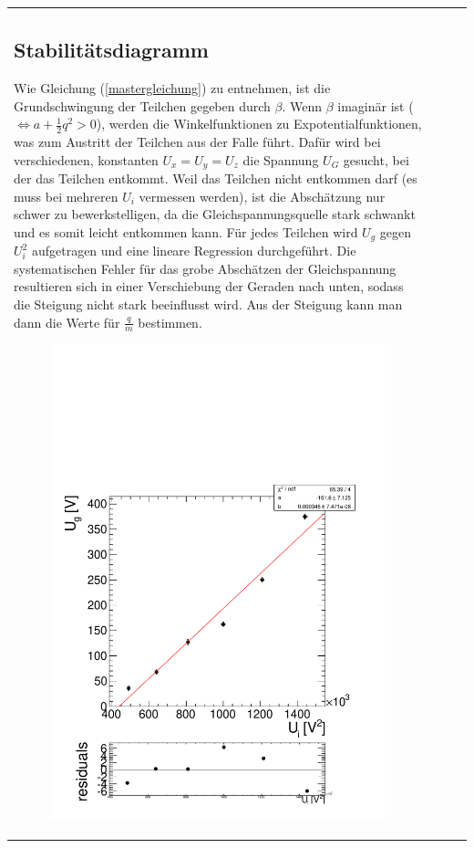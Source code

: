 \documentclass[a4paper,12pt]{article}
\begin{document}
\begin{tabular}{ l | c | c | r }
\subsection{Stabilitätsdiagramm}
Wie Gleichung (\ref{mastergleichung}) zu entnehmen, ist die Grundschwingung der Teilchen gegeben durch $β$.
Wenn $β$ imaginär ist ($ \Leftrightarrow a + \frac12q^2 >0$), werden die Winkelfunktionen zu Expotentialfunktionen, was zum Austritt der Teilchen aus der Falle führt.
Dafür wird bei verschiedenen, konstanten $U_x = U_y = U_z$ die Spannung $U_G$ gesucht, bei der das Teilchen entkommt.
Weil das Teilchen nicht entkommen darf (es muss bei mehreren $U_i$ vermessen werden), ist die Abschätzung nur schwer zu bewerkstelligen, da die Gleichspannungsquelle stark schwankt und es somit leicht entkommen kann.
Für jedes Teilchen wird $U_g$ gegen $U_i^2$ aufgetragen und eine lineare Regression durchgeführt.
Die systematischen Fehler für das grobe Abschätzen der Gleichspannung resultieren sich in einer Verschiebung der Geraden nach unten, sodass die Steigung nicht stark beeinflusst wird.
Aus der Steigung kann man dann die Werte für $\frac{q}{m}$ bestimmen.
\begin{figure}[htb]
		\centering
		\includegraphics[height = 0.3\textheight]{../analyse/stabilitaet1.pdf}

\end{figure}
\end{tabular}
\end{document}
